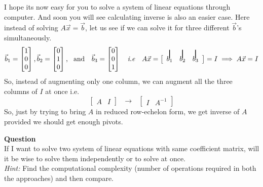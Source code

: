 \documentclass{article}
\newcommand\vstrike[1]{\stackon[0pt]{#1}{\smash{\rule[-3pt]{1pt}{2.9ex}}}}
\begin{document}
I hope its now easy for you to solve a system of linear equations through computer. And soon you will see calculating inverse is also an easier case. Here instead of solving $A\vec{x} = \vec{b}$, let us see if we can solve it for three different $\vec{b}$'s simultaneously.
\[
\vec{b}_1 = \begin{bmatrix}
    1\\0\\0
\end{bmatrix},
\vec{b}_2 = \begin{bmatrix}
    0\\1\\0
\end{bmatrix} ,~~\text{and}~~~
\vec{b}_3 = \begin{bmatrix}
    0\\0\\1
\end{bmatrix}\\
~~~\textit{i.e}~~~ 
A\vec{x} =
\left[\begin{array}{c c c }
    \vstrike{$b_1$} & \vstrike{$b_2$} & \vstrike{$b_3$}\\ 
 \end{array}\right]  = I
\implies A\vec{x} = I
\]
So, instead of augmenting only one column, we can augment all the three columns of $I$ at once i.e.
\[
\left[\begin{array}{c|c}
 A & I
  \end{array}\right]
  ~~~\longrightarrow~~~
  \left[\begin{array}{c|c}
    I & A^{-1}
  \end{array}\right]
\]
So, just by trying to bring $A$ in reduced row-echelon form, we get inverse of $A$ provided we should get enough pivots.

\textbf{Question}\\
If I want to solve two system of linear equations with same coefficient matrix, will it be wise to solve them independently or to solve at once.\\
\textit{Hint:} Find the computational complexity (number of operations required in both the approaches) and then compare.
\end{document}
